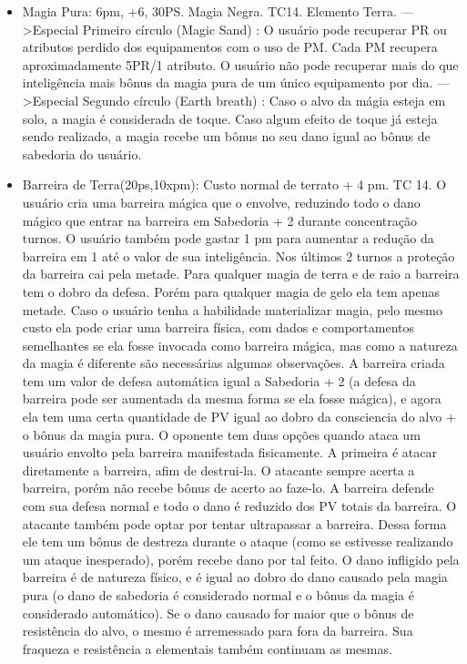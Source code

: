 \begin{itemize}
	\item Magia Pura: 6pm, +6, 30PS. Magia Negra. TC14. Elemento Terra.\newline 
--->Especial Primeiro círculo (Magic Sand) : O usuário pode recuperar PR ou atributos perdido dos equipamentos com o uso de PM. Cada PM recupera aproximadamente 5PR/1 atributo. O usuário não pode recuperar mais do que inteligência mais bônus da magia pura de um único equipamento por dia.\newline
--->Especial Segundo círculo (Earth breath) : Caso o alvo da mágia esteja em solo, a magia é considerada de toque. Caso algum efeito de toque já esteja sendo realizado, a magia recebe um bônus no seu dano igual ao bônus de sabedoria do usuário.


	\item Barreira de Terra(20ps,10xpm): Custo normal de terrato + 4 pm. TC 14.\newline
O usuário cria uma barreira mágica que o envolve, reduzindo todo o dano mágico que entrar na barreira em Sabedoria + 2 durante concentração turnos. O usuário também pode gastar 1 pm para aumentar a redução da barreira em 1 até o valor de sua inteligência. Nos últimos 2 turnos a proteção da barreira cai pela metade. Para qualquer magia de terra e de raio a barreira tem o dobro da defesa. Porém para qualquer magia de gelo ela tem apenas metade. Caso o usuário tenha a habilidade materializar magia, pelo mesmo custo ela pode criar uma barreira física, com dados e comportamentos semelhantes se ela fosse invocada como barreira mágica, mas como a natureza da magia é diferente são necessárias algumas observações. A barreira criada tem um valor de defesa automática igual a Sabedoria + 2 (a defesa da barreira pode ser aumentada da mesma forma se ela fosse mágica), e agora ela tem uma certa quantidade de PV igual ao dobro da consciencia do alvo + o bônus da magia pura. O oponente tem duas opções quando ataca um usuário envolto pela barreira manifestada fisicamente. A primeira é atacar diretamente a barreira, afim de destrui-la. O atacante sempre acerta a barreira, porém não recebe bônus de acerto ao faze-lo. A barreira defende com sua defesa normal e todo o dano é reduzido dos PV totais da barreira. O atacante também pode optar por tentar ultrapassar a barreira. Dessa forma ele tem um bônus de destreza durante o ataque (como se estivesse realizando um ataque inesperado), porém recebe dano por tal feito. O dano infligido pela barreira é de natureza físico, e é igual ao dobro do dano causado pela magia pura (o dano de sabedoria é considerado normal e o bônus da magia é considerado automático). Se o dano causado for maior que o bônus de resistência do alvo, o mesmo é arremessado para fora da barreira. Sua fraqueza e resistência a elementais também continuam as mesmas. 


\end{itemize}
